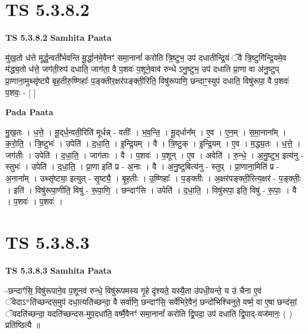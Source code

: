 \documentclass[17pt]{extarticle}
\begin{document}

\section{ TS 5.3.8.2 }

\textbf{TS 5.3.8.2 } \newline
\textbf{Samhita Paata} \newline

मु॑ख॒तो ध॑त्ते मूर्द्ध॒न्वती᳚र्भवन्ति मू॒र्द्धान॑मे॒वैनꣳ॑ समा॒नानां᳚ करोति त्रि॒ष्टुभ॒ उप॑ दधातीन्द्रि॒यं ॅवै त्रि॒ष्टुगि॑न्द्रि॒यमे॒व म॑द्ध्य॒तो ध॑त्ते॒ जग॑ती॒रुप॑ दधाति॒ जाग॑ता॒ वै प॒शवः॑ प॒शूने॒वाव॑ रुन्धे ऽनु॒ष्टुभ॒ उप॑ दधाति प्रा॒णा वा अ॑नु॒ष्टुप् प्रा॒णाना॒मुथ्सृ॑ष्ट्यै बृह॒तीरु॒ष्णिहाः᳚ प॒ङ्क्तीर॒क्षर॑पङ्क्ती॒रिति॒ विषु॑रूपाणि॒ छन्दाꣳ॒॒स्युप॑ दधाति॒ विषु॑रूपा॒ वै प॒शवः॑ प॒शवः॒ - [  ] \newline

\textbf{Pada Paata} \newline

मु॒ख॒तः । ध॒त्ते॒ । मू॒द्‌र्ध॒न्वती॒रिति॑ मूर्धन्न् - वतीः᳚ । भ॒व॒न्ति॒ । मू॒द्‌र्धान᳚म् । ए॒व । ए॒न॒म् । स॒मा॒नाना᳚म् । क॒रो॒ति॒ । त्रि॒ष्टुभः॑ । उपेति॑ । द॒धा॒ति॒ । इ॒न्द्रि॒यम् । वै । त्रि॒ष्टुक् । इ॒न्द्रि॒यम् । ए॒व । म॒द्ध्य॒तः । ध॒त्ते॒ । जग॑तीः । उपेति॑ । द॒धा॒ति॒ । जाग॑ताः । वै । प॒शवः॑ । प॒शून् । ए॒व । अवेति॑ । रु॒न्धे॒ । अ॒नु॒ष्टुभ॒ इत्य॑नु - स्तुभः॑ । उपेति॑ । द॒धा॒ति॒ । प्रा॒णा इति॑ प्र - अ॒नाः । वै । अ॒नु॒ष्टुबित्य॑नु - स्तुप् । प्रा॒णाना॒मिति॑ प्र -  अ॒नाना᳚म् । उथ्सृ॑ष्ट्या॒ इत्युत् - सृ॒ष्ट्यै॒ । बृ॒ह॒तीः । उ॒ष्णिहाः᳚ । प॒ङ्क्तीः । अ॒क्षर॑पङ्क्ती॒रित्य॒क्षर॑ - प॒ङ्क्तीः॒ । इति॑ । विषु॑रूपा॒णीति॒ विषु॑ - रू॒पा॒णि॒ । छन्दाꣳ॑सि । उपेति॑ । द॒धा॒ति॒ । विषु॑रूपा॒ इति॒ विषु॑ - रू॒पाः॒ । वै । प॒शवः॑ । प॒शवः॑ ।  \newline





\section{ TS 5.3.8.3 }

\textbf{TS 5.3.8.3 } \newline
\textbf{Samhita Paata} \newline

-छन्दाꣳ॑सि॒ विषु॑रूपाने॒व प॒शूनव॑ रुन्धे॒ विषु॑रूपमस्य गृ॒हे दृ॑श्यते॒ यस्यै॒ता उ॑पधी॒यन्ते॒ य उ॑ चैना ए॒वं ॅवेदाऽ*ति॑च्छन्दस॒मुप॑ दधा॒त्यति॑च्छन्दा॒ वै सर्वा॑णि॒ छन्दाꣳ॑सि॒ सर्वे॑भिरे॒वैनं॒ छन्दो॑भिश्चिनुते॒ वर्ष्म॒ वा ए॒षा छन्द॑सां॒ ॅयदति॑च्छन्दा॒ यदति॑च्छन्दस-मुप॒दधा॑ति॒ वर्ष्मै॒वैनꣳ॑ समा॒नानां᳚ करोति द्वि॒पदा॒ उप॑ दधाति द्वि॒पाद्-यज॑मानः॒ ( ) प्रति॑ष्ठित्यै ॥ \newline
\end{document}
